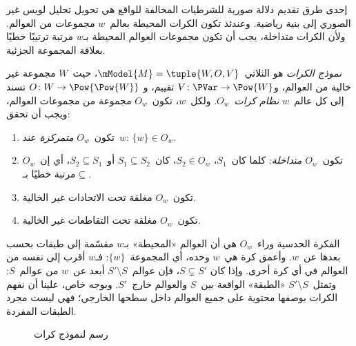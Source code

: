 \documentclass[../../../include/open-logic-section]{subfiles}
\begin{document}


إحدى طرق تقديم دلالة صورية للشرطيات المخالفة للواقع هي تحويل تحليل لويس
غير الصوري إلى بنية رياضية. وعندئذ تكون الكرات المحيطة بعالم~$w$
مجموعات من العوالم. ولأن الكرات متداخلة، يجب أن تكون مجموعات العوالم
المحيطة بـ$w$ مرتبة ترتيبًا خطيًا بعلاقة المجموعة الجزئية.

\begin{defn}
  \emph{نموذج الكرات} هو الثلاثي~$\mModel{M} = \tuple{W, O, V}$،
  حيث~$W$ مجموعة غير خالية من العوالم،
  و$V\colon \PVar \to \Pow{W}$ تقييم، و
  $O\colon W \to \Pow{\Pow{W}}$ تسند إلى كل عالم~$w$
  \emph{نظام كرات}~$O_w$. ولكل~$w$، تكون~$O_w$ مجموعة من مجموعات
  العوالم، ويجب أن تحقق:
  \begin{enumerate}
  \item تكون~$O_w$ \emph{متمركزة} عند~$w$: $\{w\} \in O_w$.
  \item تكون~$O_w$ \emph{متداخلة}: كلما كان~$S_1$، $S_2 \in O_w$،
    كان~$S_1 \subseteq S_2$ أو~$S_2 \subseteq S_1$، أي إن~$O_w$
    مرتبة خطيًا بـ$\subseteq$.
  \item تكون~$O_w$ مغلقة تحت الاتحادات غير الخالية.
  \item تكون~$O_w$ مغلقة تحت التقاطعات غير الخالية.
  \end{enumerate}
\end{defn}

الفكرة الحدسية وراء~$O_w$ هي أن العوالم «المحيطة» بـ$w$ مقسّمة إلى
طبقات بحسب بعدها عن~$w$. وأعمق كرة هي~$w$ وحده، أي المجموعة~$\{w\}$:
فـ$w$ أقرب إلى نفسه من العوالم في أي كرة أخرى. وإذا كان
$S \subsetneq S'$، فإن عوالم~$S' \setminus S$ أبعد عن~$w$ من
عوالم~$S$: وتمثل~$S' \setminus S$ «الطبقة» الواقعة بين~$S$ والعوالم
خارج~$S'$. وبوجه خاص، علينا أن نفهم الكرات بوصفها محتوية على جميع
العوالم داخل سطحها الخارجي؛ فهي ليست مجرد الطبقات المفردة.

\begin{figure}
\begin{center}
\caption{رسم لنموذج كرات}
\end{center}
\end{figure}
\end{document}
